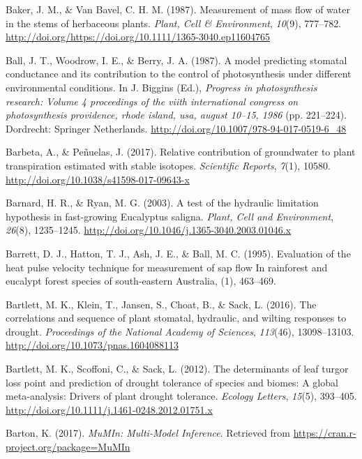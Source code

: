 \documentclass[11pt,twoside]{reedthesis}
\begin{document}
\hypertarget{ref-Baker1987}{}
Baker, J. M., \& Van Bavel, C. H. M. (1987). Measurement of mass flow of
water in the stems of herbaceous plants. \emph{Plant, Cell \&
Environment}, \emph{10}(9), 777--782.
\url{http://doi.org/https://doi.org/10.1111/1365-3040.ep11604765}

\hypertarget{ref-Ball1987}{}
Ball, J. T., Woodrow, I. E., \& Berry, J. A. (1987). A model predicting
stomatal conductance and its contribution to the control of
photosynthesis under different environmental conditions. In J. Biggins
(Ed.), \emph{Progress in photosynthesis research: Volume 4 proceedings
of the viith international congress on photosynthesis providence, rhode
island, usa, august 10--15, 1986} (pp. 221--224). Dordrecht: Springer
Netherlands. \url{http://doi.org/10.1007/978-94-017-0519-6_48}

\hypertarget{ref-barbeta_relative_2017}{}
Barbeta, A., \& Peñuelas, J. (2017). Relative contribution of
groundwater to plant transpiration estimated with stable isotopes.
\emph{Scientific Reports}, \emph{7}(1), 10580.
\url{http://doi.org/10.1038/s41598-017-09643-x}

\hypertarget{ref-barnard_test_2003}{}
Barnard, H. R., \& Ryan, M. G. (2003). A test of the hydraulic
limitation hypothesis in fast-growing Eucalyptus saligna. \emph{Plant,
Cell and Environment}, \emph{26}(8), 1235--1245.
\url{http://doi.org/10.1046/j.1365-3040.2003.01046.x}

\hypertarget{ref-Barrett1995}{}
Barrett, D. J., Hatton, T. J., Ash, J. E., \& Ball, M. C. (1995).
Evaluation of the heat pulse velocity technique for measurement of sap
flow In rainforest and eucalypt forest species of south-eastern
Australia, (1), 463--469.

\hypertarget{ref-bartlett_correlations_2016}{}
Bartlett, M. K., Klein, T., Jansen, S., Choat, B., \& Sack, L. (2016).
The correlations and sequence of plant stomatal, hydraulic, and wilting
responses to drought. \emph{Proceedings of the National Academy of
Sciences}, \emph{113}(46), 13098--13103.
\url{http://doi.org/10.1073/pnas.1604088113}

\hypertarget{ref-bartlett_determinants_2012}{}
Bartlett, M. K., Scoffoni, C., \& Sack, L. (2012). The determinants of
leaf turgor loss point and prediction of drought tolerance of species
and biomes: A global meta-analysis: Drivers of plant drought tolerance.
\emph{Ecology Letters}, \emph{15}(5), 393--405.
\url{http://doi.org/10.1111/j.1461-0248.2012.01751.x}

\hypertarget{ref-Barton2017}{}
Barton, K. (2017). \emph{MuMIn: Multi-Model Inference}. Retrieved from
\url{https://cran.r-project.org/package=MuMIn}
\end{document}
